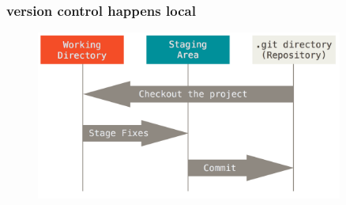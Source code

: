 
\begin{frame}
    \frametitle{version control happens local} %
    \begin{figure}[b]{\textwidth}
        \centering
        \includegraphics[width=0.9\textwidth]{../img/three_states.png}
    \end{figure}
\end{frame}


